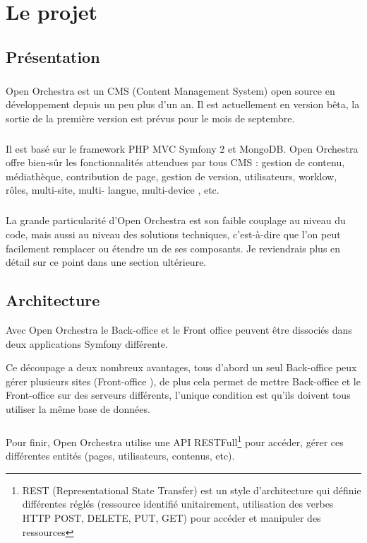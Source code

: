 \chapter{Le projet}
\section{Présentation}
        \paragraph{}
        Open Orchestra est un CMS (Content Management  System) open source en développement depuis un peu plus d'un an. Il est actuellement en version bêta, la sortie de la première version est prévus pour le mois de septembre.
        \paragraph{}
        Il est basé sur le framework PHP MVC Symfony 2 et MongoDB. Open Orchestra offre bien-sûr les fonctionnalités attendues par tous CMS : gestion de contenu, médiathèque, contribution de page, gestion de version, utilisateurs, worklow, rôles,  multi-site, multi- langue,  multi-device , etc.
        \paragraph{}
        La grande particularité d'Open Orchestra est son faible couplage au niveau du code, mais aussi au niveau des solutions techniques, c'est-à-dire que l'on peut facilement remplacer ou étendre un de ses composants. Je reviendrais plus en détail sur ce point dans une section ultérieure.
        
        \section{Architecture}
       Avec Open Orchestra le \og Back-office \fg{} et le \og Front office \fg{} peuvent être dissociés dans deux applications Symfony différente. 

        Ce découpage a deux nombreux avantages, tous d'abord un seul \og Back-office \fg{}  peux gérer plusieurs sites (\og Front-office \fg{}), de plus cela permet de mettre \og Back-office \fg{} et le \og Front-office \fg{} sur des serveurs différents, l'unique condition est qu'ils doivent tous utiliser la même base de données.
        \paragraph{}
		Pour finir, Open Orchestra utilise une API RESTFull\footnote{REST (Representational State Transfer) est un style d'architecture qui définie différentes réglés (ressource identifié unitairement, utilisation des verbes HTTP POST, DELETE, PUT, GET) pour accéder et manipuler des ressources } pour  accéder, gérer ces différentes entités (pages, utilisateurs, contenus, etc).
